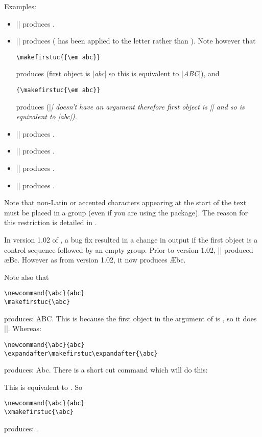 \documentclass{nlctdoc}
\begin{document}
Examples:
\begin{itemize}
\item || produces .

\item || produces 
( has been applied to the letter  rather
than ). Note however that
\begin{verbatim}
\makefirstuc{{\em abc}}
\end{verbatim}
produces  (first object is |{\em abc}| so
this is equivalent to |\MakeUppercase{\em abc}|), and
\begin{verbatim}
{\makefirstuc{\em abc}}
\end{verbatim}
produces {} (|\em| doesn't have an argument
therefore first object is |\em| and so is equivalent to
|{\MakeUppercase{\em}abc}|).

\item || produces .

\item || produces .

\item || produces .

\item || produces .

\end{itemize}
Note that non-Latin or accented characters appearing at the
start of the text must be placed in a group (even if you are
using the  package). The reason for this restriction
is detailed in .

\begin{important}
In version 1.02 of , a bug fix resulted in a change
in output if the first object is a control sequence followed by
an empty group. Prior to version 1.02, ||
produced \ae Bc. However as from version 1.02, it now produces
\AE bc.
\end{important}

Note also that
\begin{verbatim}
\newcommand{\abc}{abc}
\makefirstuc{\abc}
\end{verbatim}
produces: ABC. This is because the first object in the argument of
 is , so it does |\MakeUppercase{\abc}|.
Whereas:
\begin{verbatim}
\newcommand{\abc}{abc}
\expandafter\makefirstuc\expandafter{\abc}
\end{verbatim}
produces: Abc. There is a short cut command which will do this:
\begin{definition}[\DescribeMacro{\xmakefirstuc}]
\end{definition}
This is equivalent to . So
\begin{verbatim}
\newcommand{\abc}{abc}
\xmakefirstuc{\abc}
\end{verbatim}
produces: 
\newcommand{\abc}{abc}%
\xmakefirstuc{\abc}.
\end{document}
